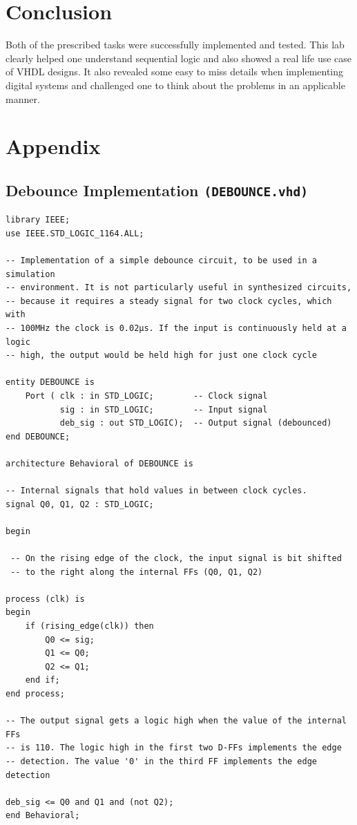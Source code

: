 \documentclass[10pt]{article}
\begin{document}
\section{Conclusion}
Both of the prescribed tasks were successfully implemented and tested. This lab clearly helped one understand sequential logic and also showed a real life use case of VHDL designs. It also revealed some easy to miss details when implementing digital systems and challenged one to think about the problems in an applicable manner.
\newpage
\section{Appendix}
\subsection{Debounce Implementation \texttt{(DEBOUNCE.vhd)}}
\begin{verbatim}
library IEEE;
use IEEE.STD_LOGIC_1164.ALL;

-- Implementation of a simple debounce circuit, to be used in a simulation
-- environment. It is not particularly useful in synthesized circuits, 
-- because it requires a steady signal for two clock cycles, which with 
-- 100MHz the clock is 0.02µs. If the input is continuously held at a logic
-- high, the output would be held high for just one clock cycle

entity DEBOUNCE is
    Port ( clk : in STD_LOGIC;        -- Clock signal
           sig : in STD_LOGIC;        -- Input signal
           deb_sig : out STD_LOGIC);  -- Output signal (debounced)
end DEBOUNCE;

architecture Behavioral of DEBOUNCE is

-- Internal signals that hold values in between clock cycles.
signal Q0, Q1, Q2 : STD_LOGIC;

begin

 -- On the rising edge of the clock, the input signal is bit shifted 
 -- to the right along the internal FFs (Q0, Q1, Q2)
 
process (clk) is
begin  
    if (rising_edge(clk)) then
        Q0 <= sig;
        Q1 <= Q0;
        Q2 <= Q1;
    end if;
end process;

-- The output signal gets a logic high when the value of the internal FFs 
-- is 110. The logic high in the first two D-FFs implements the edge 
-- detection. The value '0' in the third FF implements the edge detection

deb_sig <= Q0 and Q1 and (not Q2);
end Behavioral;
\end{verbatim}
\newpage
\end{document}
